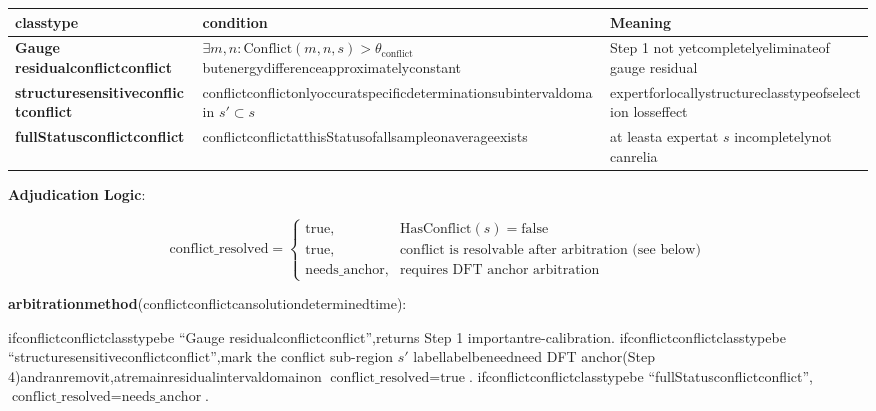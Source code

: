 \documentclass[
  12pt,
]{article}
\begin{document}
\begin{longtable}[]{@{}
  >{\raggedright\arraybackslash}p{}
  >{\raggedright\arraybackslash}p{}
  >{\raggedright\arraybackslash}p{}@{}}
\toprule\noalign{}
\begin{minipage}[b]{\linewidth}\raggedright
classtype
\end{minipage} & \begin{minipage}[b]{\linewidth}\raggedright
condition
\end{minipage} & \begin{minipage}[b]{\linewidth}\raggedright
Meaning
\end{minipage} \\
\midrule\noalign{}
\endhead
\bottomrule\noalign{}
\endlastfoot
\textbf{Gauge residualconflictconflict} &
\(\exists m,n: \text{Conflict}(m,n,s) > \theta_{\text{conflict}}\)
butenergydifferenceapproximatelyconstant & Step 1 not yetcompletelyeliminateof gauge residual \\
\textbf{structuresensitiveconflictconflict} & conflictconflictonlyoccuratspecificdeterminationsubintervaldomain \(s' \subset s\) &
expertforlocallystructureclasstypeofselection losseffect \\
\textbf{fullStatusconflictconflict} & conflictconflictatthisStatusofallsampleonaverageexists & at leasta  expertat
\(s\) incompletelynot canrelia \\
\end{longtable}

\textbf{Adjudication Logic}:

\[\text{conflict\_resolved} = \begin{cases}
\text{true}, & \text{HasConflict}(s) = \text{false} \\[0.5em]
\text{true}, & \text{conflict is resolvable after arbitration (see below)} \\[0.5em]
\text{needs\_anchor}, & \text{requires DFT anchor arbitration}
\end{cases}\]

\textbf{arbitrationmethod}(conflictconflictcansolutiondeterminedtime):

ifconflictconflictclasstypebe ``Gauge residualconflictconflict'',returns Step 1 importantre-calibration. ifconflictconflictclasstypebe
``structuresensitiveconflictconflict'',mark the conflict sub-region \(s'\) labellabelbeneedneed DFT anchor(Step
4)andranremovit,atremainresidualintervaldomainon \(\text{conflict\_resolved} = \text{true}\).
ifconflictconflictclasstypebe
``fullStatusconflictconflict'',\(\text{conflict\_resolved} = \text{needs\_anchor}\).
\end{document}
